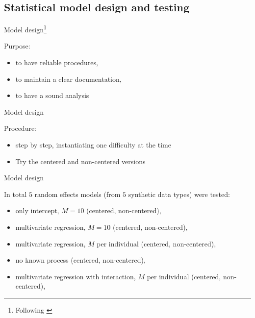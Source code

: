 \subsection{Statistical model design and testing}
%
%
\begin{frame}[t, negative]
	\subsectionpage
\end{frame}
%
%
\begin{lhframe}[rhgraphic={\texttt{[image: model\_design1.png]}}]
	{Model design\footnote{Following \citet{Fogarty_et_al_2022}}}
	
	Purpose:
	\begin{itemize}
		\item to have reliable procedures,
		\item to maintain a clear documentation,
		\item to have a sound analysis
	\end{itemize}
\end{lhframe}
%
%
\begin{lhframe}[rhgraphic={\texttt{[image: model\_design2.png]}}]
	{Model design}
	
	Procedure:
	\begin{itemize}
		\item step by step, instantiating one difficulty at the time
		\item Try the centered and non-centered versions
	\end{itemize}
\end{lhframe}
%
%
\begin{lhframe}[rhgraphic={\texttt{[image: model\_design3.png]}}]
	{Model design}
	
	In total $5$ random effects models (from $5$ synthetic data types) were tested: 
	\begin{itemize}
		\item only intercept, $M=10$ (centered, non-centered), 
		\item multivariate regression, $M=10$ (centered, non-centered),
		\item multivariate regression, $M$ per individual (centered, non-centered),
		\item no known process (centered, non-centered),
		\item multivariate regression with interaction, $M$ per individual (centered, non-centered),
	\end{itemize}
\end{lhframe}
